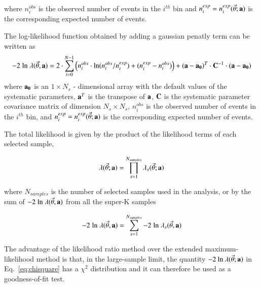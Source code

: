 where
$n^{obs}_{i}$ is the observed number of events in the $i^{th}$ bin and
$n^{exp}_{i} = n^{exp}_{i}(\vec{\theta}; {\bf a})$ 
is the corresponding expected number of events.


The log-likelihood function obtained by adding a gaussian penatly term can be written as
\begin{equation} \label{eq:chisquare_penalty}
-2 \; \textrm{ln} \; \lambda (\vec{\theta},{\bf a}) = 2 \cdot \sum_{i=0}^{N-1} 
   \Big( 
     n^{obs}_{i} \cdot \textrm{ln} (n^{obs}_{i}/n^{exp}_{i}) +
     (n^{exp}_{i}-n^{obs}_{i}) 
   \Big) +
   ({\bf a}-{\bf a_{0}})^{T} \cdot {\bf C}^{-1} \cdot ({\bf a}-{\bf a_{0}})
\end{equation}
where
${\bf a_{0}}$ is an $1 \times N_{s}$ - dimensional array with the default values of 
the systematic parameters, ${\bf a}^{T}$ is the transpose of ${\bf a}$,
${\bf C}$ is the systematic parameter covariance matrix of dimension $N_{s} \times N_{s}$,
$n^{obs}_{i}$ is the observed number of events in the $i^{th}$ bin, and
$n^{exp}_{i} = n^{exp}_{i}(\vec{\theta}; {\bf a})$ 
is the corresponding expected number of events.

The total likelihood is given by the product of the likelihood terms of each selected sample,

\begin{equation} \label{eq:totlike}
\lambda(\vec{\theta}; {\bf a}) = \prod_{s=1}^{N_{samples}} \lambda_s (\vec{\theta}; {\bf a})
\end{equation}

where $N_{samples}$ is the number of selected samples used in the analysis, or
by the sum of $-2 \; \textrm{ln} \; \lambda (\vec{\theta},{\bf a})$ from all the super-K samples

\begin{equation} \label{eq:totlike_2}
-2 \; \textrm{ln} \; \lambda (\vec{\theta},{\bf a}) = \sum_{s=1}^{N_{samples}} -2 \; \textrm{ln} \; \lambda_s (\vec{\theta},{\bf a})
\end{equation}

The advantage of the likelihood ratio method over the extended maximum-likelihood method is that,
in the large-sample limit, the quantity 
$-2 \: \textrm{ln} \: \lambda (\vec{\theta}; {\bf a})$
in Eq.~\ref{eq:chisquare} has a $\chi^{2}$ distribution and it can therefore be used as a goodness-of-fit test.


